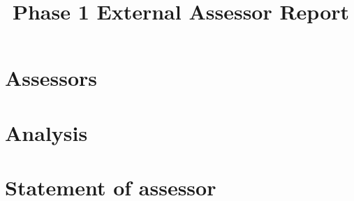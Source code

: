 \documentclass[]{report}
\title{Phase 1 External Assessor Report}
\author{\firmfullname}
\begin{document}
\maketitle
\section{Assessors}


\section{Analysis}

\section{Statement of assessor}

\end{document}
